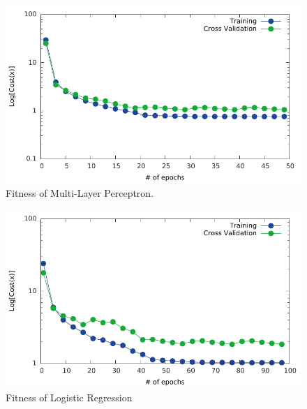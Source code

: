 \message{ !name(main.tex)}\documentclass[11pt]{article}
\begin{document}
\begin{minipage}{0.47\linewidth}
  \begin{figure}[H]
    \centering
    \includegraphics[width=\linewidth]{epoch_mlp}
    \caption{Fitness of Multi-Layer Perceptron.}
    \label{fig:epoch_mlp}
  \end{figure}
\end{minipage}\hfill
\begin{minipage}{0.47\linewidth}
  \begin{figure}[H]
    \centering
    \includegraphics[width=\linewidth]{epoch_logit}
    \caption{Fitness of Logistic Regression}
    \label{fig:epoch_logit}
  \end{figure}
\end{minipage}
\end{document}

